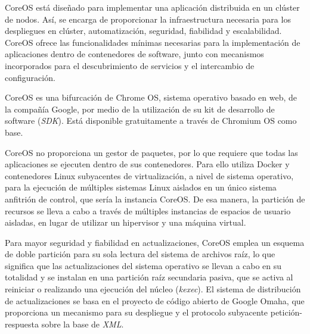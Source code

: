 
CoreOS está diseñado para implementar una aplicación distribuida en un clúster de nodos. Así, se encarga de proporcionar la infraestructura necesaria para los despliegues en clúster, automatización, seguridad, fiabilidad y escalabilidad. CoreOS ofrece las funcionalidades mínimas necesarias para la implementación de aplicaciones dentro de contenedores de software, junto con mecanismos incorporados para el descubrimiento de servicios y el intercambio de configuración.

CoreOS es una bifurcación de Chrome OS, sistema operativo basado en web, de la compañía Google, por medio de la utilización de su kit de desarrollo de software (\textit{SDK}). Está disponible gratuitamente a través de Chromium OS como base.

CoreOS no proporciona un gestor de paquetes, por lo que requiere que todas las aplicaciones se ejecuten dentro de sus contenedores. Para ello utiliza Docker y contenedores Linux subyacentes de virtualización, a nivel de sistema operativo, para la ejecución de múltiples sistemas Linux aislados en un único sistema anfitrión de control, que sería la instancia CoreOS. De esa manera, la partición de recursos se lleva a cabo a través de múltiples instancias de espacios de usuario aisladas, en lugar de utilizar un hipervisor y una máquina virtual.

Para mayor seguridad y fiabilidad en actualizaciones, CoreOS emplea un esquema de doble partición para su sola lectura del sistema de archivos raíz, lo que significa que las actualizaciones del sistema operativo se llevan a cabo en su totalidad y se instalan en una partición raíz secundaria pasiva, que se activa al reiniciar o realizando una ejecución del núcleo (\textit{kexec}). El sistema de distribución de actualizaciones se basa en el proyecto de código abierto de Google Omaha, que proporciona un mecanismo para su despliegue y el protocolo subyacente petición-respuesta sobre la base de \textit{XML}.


